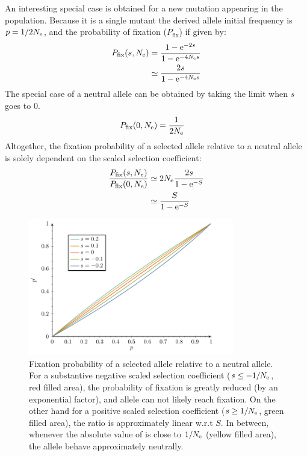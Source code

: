 An interesting special case is obtained for a new mutation appearing in the population.
Because it is a single mutant the derived \gls{allele} initial frequency is $p = 1 / 2 N_{\textrm{e}}$, and the probability of fixation ($P_{\mathrm{fix}}$) if given by:
\begin{align}
	P_{\mathrm{fix}}(s, N_{\textrm{e}}) & = \dfrac{1 - \mathrm{e}^{-2 s}}{1 - \mathrm{e}^{-4 N_{\textrm{e}} s}} \\
	 & \simeq  \dfrac{2 s }{1 - \mathrm{e}^{-4 N_{\textrm{e}} s}}
\end{align}
The special case of a \gls{neutral} \gls{allele} can be obtained by taking the limit when $s$ goes to $0$.
\begin{align}
P_{\mathrm{fix}}(0, N_{\textrm{e}}) & = \dfrac{1}{2 N_{\textrm{e}}}
\end{align}
Altogether, the fixation probability of a selected \gls{allele} relative to a \gls{neutral} \gls{allele} is solely dependent on the scaled selection coefficient:
\begin{align}
\dfrac{P_{\mathrm{fix}}(s, N_{\textrm{e}})}{P_{\mathrm{fix}}(0, N_{\textrm{e}})} & \simeq 2 N_{\textrm{e}} \dfrac{2s}{1 - \mathrm{e}^{-S}} \\
& \simeq  \dfrac{S}{1 - \mathrm{e}^{-S}}
\end{align}
\begin{figure}[H]
	\begin{center}
		\includegraphics[width=0.8\textwidth, page=2] {figures.pdf}
	\end{center}
	\caption[Relative fixation probability]{Fixation probability of a selected \gls{allele} relative to a \gls{neutral} \gls{allele}.
	For a substantive negative scaled selection coefficient ($s \leq -1/N_{\textrm{e}}$, red filled area), the probability of fixation is greatly reduced (by an exponential factor), and \gls{allele} can not likely reach fixation. On the other hand for a positive scaled selection coefficient ($s \geq 1 / N_{\textrm{e}}$, green filled area), the ratio is approximately linear w.r.t $S$. In between, whenever the absolute value of is close to $1 / N_{\textrm{e}}$ (yellow filled area), the \gls{allele} behave approximately neutrally.}
\end{figure}

